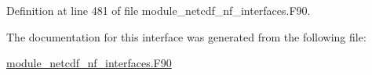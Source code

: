 Definition at line 481 of file module\+\_\+netcdf\+\_\+nf\+\_\+interfaces.\+F90.



The documentation for this interface was generated from the following file\+:\begin{DoxyCompactItemize}
\item 
\hyperlink{module__netcdf__nf__interfaces_8F90}{module\+\_\+netcdf\+\_\+nf\+\_\+interfaces.\+F90}\end{DoxyCompactItemize}
